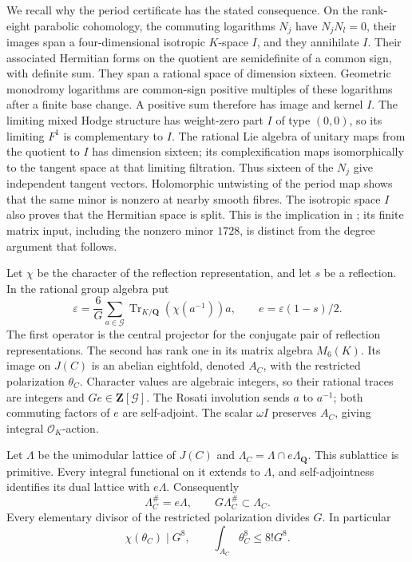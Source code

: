 \documentclass[11pt]{article}
\theoremstyle{definition}
\theoremstyle{remark}
\newcommand{\Q}{\mathbf Q}
\newcommand{\Z}{\mathbf Z}
\begin{document}
We recall why the period certificate has the stated consequence. On the
rank-eight parabolic cohomology, the commuting logarithms $N_j$ have
$N_jN_l=0$, their images span a four-dimensional isotropic $K$-space
$I$, and they annihilate $I$. Their associated Hermitian forms on the
quotient are semidefinite of a common sign, with definite sum. They span
a rational space of dimension sixteen. Geometric monodromy logarithms
are common-sign positive multiples of these logarithms after a finite
base change. A positive sum therefore has image and kernel $I$. The
limiting mixed Hodge structure has weight-zero part $I$ of type $(0,0)$,
so its limiting $F^1$ is complementary to $I$. The rational Lie algebra
of unitary maps from the quotient to $I$ has dimension sixteen; its
complexification maps isomorphically to the tangent space at that
limiting filtration. Thus sixteen of the $N_j$ give independent tangent
vectors. Holomorphic untwisting of the period map shows that the same
minor is nonzero at nearby smooth fibres. The isotropic space $I$ also
proves that the Hermitian space is split. This is the implication in
\cite[Lemmas~8.2--8.4 and Proposition~8.5]{Severn}; its finite matrix
input, including the nonzero minor $1728$, is distinct from the degree
argument that follows.

Let $\chi$ be the character of the reflection representation, and let
$s$ be a reflection. In the rational group algebra put
\[
 \varepsilon=\frac6G\sum_{a\in\mathcal G}
       \operatorname{Tr}_{K/\Q}(\chi(a^{-1}))a,
 \qquad e=\varepsilon(1-s)/2.
\]
The first operator is the central projector for the conjugate pair of
reflection representations. The second has rank one in its matrix
algebra $M_6(K)$. Its image on $J(C)$ is an abelian eightfold, denoted
$A_C$, with the restricted polarization $\theta_C$. Character values
are algebraic integers, so their rational traces are integers and
$Ge\in\Z[\mathcal G]$. The Rosati involution sends $a$ to $a^{-1}$;
both commuting factors of $e$ are self-adjoint. The scalar $\omega I$
preserves $A_C$, giving integral $\mathcal O_K$-action.

Let $\Lambda$ be the unimodular lattice of $J(C)$ and
$\Lambda_C=\Lambda\cap e\Lambda_\Q$. This sublattice is primitive.
Every integral functional on it extends to $\Lambda$, and
self-adjointness identifies its dual lattice with $e\Lambda$.
Consequently
\[
 \Lambda_C^{\#}=e\Lambda,\qquad
 G\Lambda_C^{\#}\subset\Lambda_C.
\]
Every elementary divisor of the restricted polarization divides $G$.
In particular
\begin{equation}\label{eq:eis-source-volume}
 \chi(\theta_C)\mid G^8,
 \qquad \int_{A_C}\theta_C^8\le8!G^8.
\end{equation}
\end{document}
